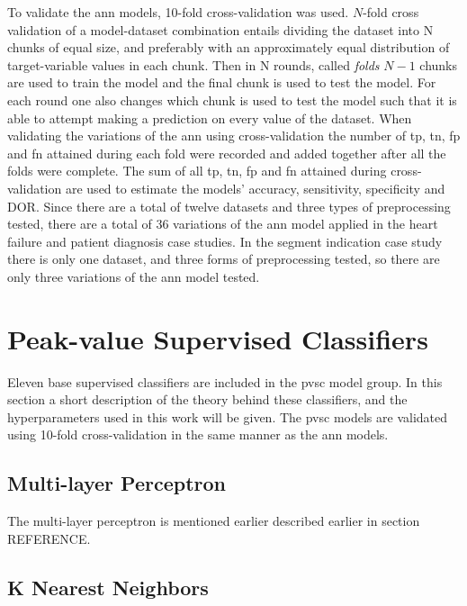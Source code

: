 To validate the \acrshort{ann} models, 10-fold cross-validation was used. $N$-fold cross validation of a model-dataset combination entails dividing the dataset into N chunks of equal size, and preferably with an approximately equal distribution of target-variable values in each chunk. Then in N rounds, called \textit{folds} $N-1$ chunks are used to train the model and the final chunk is used to test the model. For each round one also changes which chunk is used to test the model such that it is able to attempt making a prediction on every value of the dataset. When validating the variations of the \acrshort{ann} using cross-validation the number of \acrshort{tp}, \acrshort{tn}, \acrshort{fp} and \acrshort{fn} attained during each fold were recorded and added together after all the folds were complete. The sum of all \acrshort{tp}, \acrshort{tn}, \acrshort{fp} and \acrshort{fn} attained during cross-validation are used to estimate the models' accuracy, sensitivity, specificity and DOR. Since there are a total of twelve datasets and three types of preprocessing tested, there are a total of 36 variations of the \acrshort{ann} model applied in the heart failure and patient diagnosis case studies. In the segment indication case study there is only one dataset, and three forms of preprocessing tested, so there are only three variations of the \acrshort{ann} model tested.

\section{Peak-value Supervised Classifiers} \label{sec:meth_pvsc}

Eleven base supervised classifiers are included in the \acrshort{pvsc} model group. In this section a short description of the theory behind these classifiers, and the hyperparameters used in this work will be given. The \acrshort{pvsc} models are validated using 10-fold cross-validation in the same manner as the \acrshort{ann} models.

\subsection*{Multi-layer Perceptron}
The multi-layer perceptron is mentioned earlier described earlier in section REFERENCE. 

\subsection*{K Nearest Neighbors}

